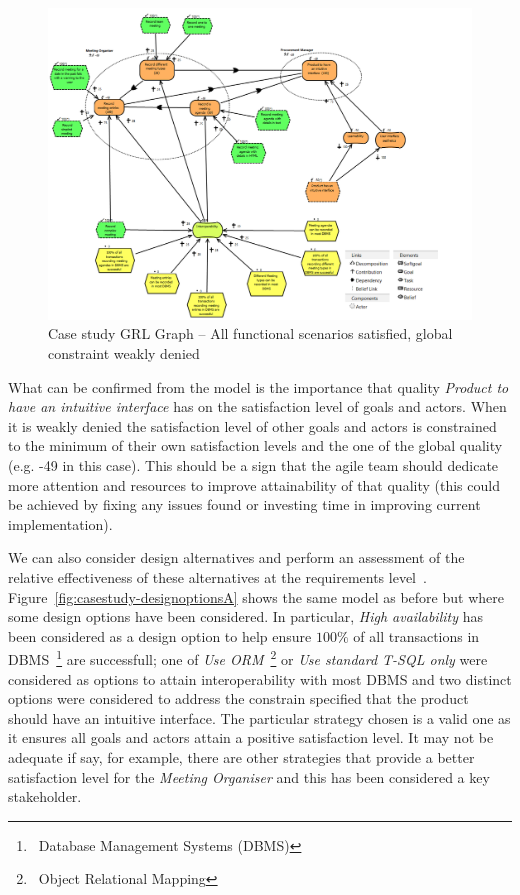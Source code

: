 \documentclass[dissertation,final]{softeng}
\begin{document}
\begin{figure}
\includegraphics[width=\columnwidth]{casestudy-functionalscenarios-globalconstraint-denied}
\centering
\caption{Case study GRL Graph -- All functional scenarios satisfied, global constraint weakly denied}
\label{fig:casestudy-functionalscenarios-globalconstraint-denied}
\end{figure} 

What can be confirmed from the model is the importance that quality \emph{Product to have an intuitive interface} has on the satisfaction level of goals and actors. When it is weakly denied the satisfaction level of other goals and actors is constrained to the minimum of their own satisfaction levels and the one of the global quality (e.g. -49 in this case). This should be a sign that the agile team should dedicate more attention and resources to improve attainability of that quality (this could be achieved by fixing any issues found or investing time in improving current implementation).

We can also consider design alternatives and perform an assessment of the relative effectiveness of these alternatives at the requirements level~\citep{Amyot2010}. Figure~\ref{fig:casestudy-designoptionsA} shows the same model as before but where some design options have been considered. In particular, \emph{High availability} has been considered as a design option to help ensure $100\%$ of all transactions in DBMS~\footnote{~Database Management Systems (DBMS)} are successfull; one of \emph{Use ORM}~\footnote{~Object Relational Mapping} or \emph{Use standard T-SQL only} were considered as options to attain interoperability with most DBMS and two distinct options were considered to address the constrain specified that the product should have an intuitive interface. The particular strategy chosen is a valid one as it ensures all goals and actors attain a positive satisfaction level. It may not be adequate if say, for example, there are other strategies that provide a better satisfaction level for the \emph{Meeting Organiser} and this has been considered a key stakeholder.
\end{document}

